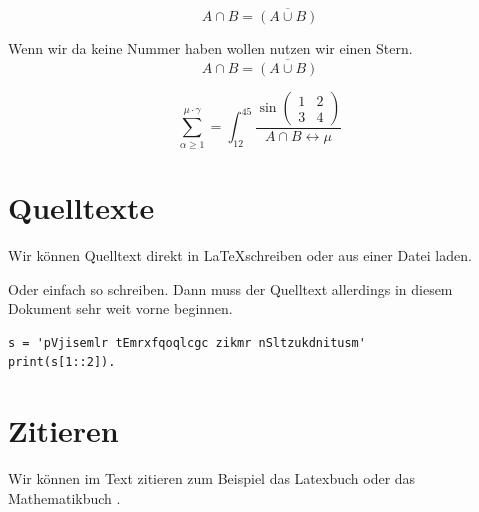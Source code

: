 \documentclass[fontsize=11]{scrartcl}
\begin{document}
	\begin{equation}
		A\cap B = \overline{ (A\cup B)}
	\end{equation}
	
	Wenn wir da keine Nummer haben wollen nutzen wir einen Stern.
	\begin{equation*}
	A\cap B = \overline{ (A\cup B)}
	\end{equation*}
	
	\begin{equation}
		\sum_{\alpha\geq 1}^{\mu \cdot \gamma} = \int_{12}^{45} \frac{\sin{\begin{pmatrix}
		1 & 2 \\
		3 & 4
		\end{pmatrix}}}{A\cap B\leftrightarrow \mu}
	\end{equation}
	
	
	\section{Quelltexte}
	Wir können Quelltext direkt in \LaTeX schreiben oder aus einer Datei laden.
	

	Oder einfach so schreiben. Dann muss der Quelltext allerdings in diesem Dokument sehr weit vorne beginnen.
	\begin{lstlisting}[caption=Genau der gleiche Quellcode]
s = 'pVjisemlr tEmrxfqoqlcgc zikmr nSltzukdnitusm'
print(s[1::2]).
	\end{lstlisting}
	
	
	\section{Zitieren}
	Wir können im Text zitieren zum Beispiel das Latexbuch \cite{Hed09} oder das Mathematikbuch \cite{Tes08}.
	
	
	\listoffigures
	
	\lstlistoflistings
	
	\printbibliography 
	








	
\end{document}
